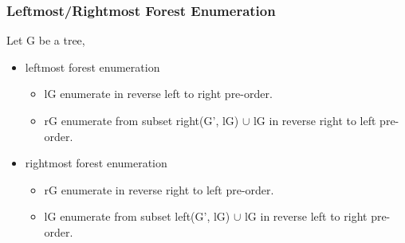 \documentclass{beamer}
\begin{document}
\begin{frame}
\frametitle{Leftmost/Rightmost Forest Enumeration}
Let G be a tree,

\hspace{3cm}
\hspace{3cm}

\begin{itemize}
\item leftmost forest enumeration
\begin{itemize}
\item lG enumerate in reverse left to right pre-order.
\item rG enumerate from subset right(G', lG) $\cup$ lG in reverse right to left pre-order.
\end{itemize}
\item rightmost forest enumeration
\begin{itemize}
\item rG enumerate in reverse right to left pre-order.
\item lG enumerate from subset left(G', lG) $\cup$ lG in reverse left to right pre-order.
\end{itemize}
\end{itemize}
\end{frame}
\end{document}
